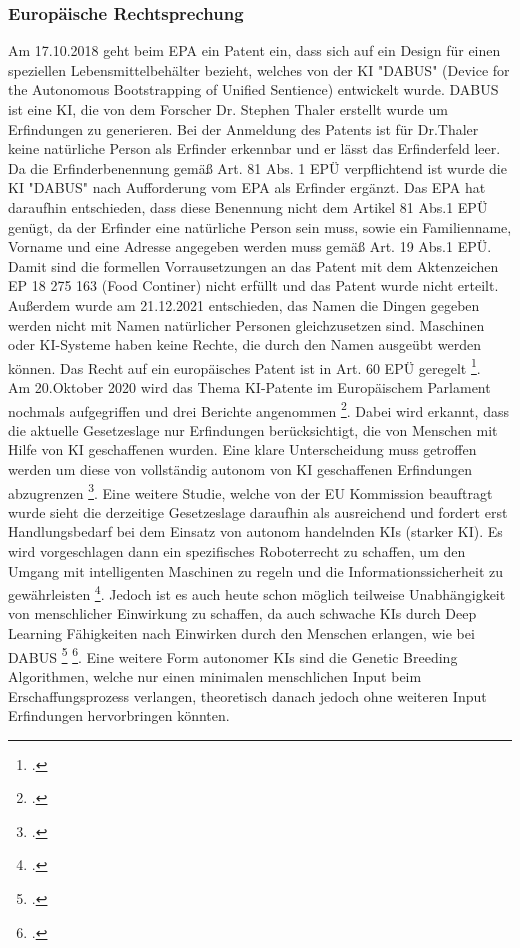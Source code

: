 \subsubsection{Europäische Rechtsprechung}
Am 17.10.2018 geht beim \gls{EPA} ein Patent ein, 
dass sich auf ein Design für einen speziellen Lebensmittelbehälter
bezieht,
welches von der KI "DABUS" (Device for the Autonomous Bootstrapping of Unified Sentience) 
entwickelt wurde. DABUS ist eine
KI, die von dem Forscher Dr. Stephen Thaler erstellt wurde
um Erfindungen zu generieren.
Bei der Anmeldung des Patents ist für Dr.Thaler 
keine natürliche Person als Erfinder
erkennbar und er lässt das Erfinderfeld
leer. Da die Erfinderbenennung gemäß Art. 81 Abs. 1 EPÜ verpflichtend
ist wurde die KI 
"DABUS"
nach Aufforderung vom EPA
als Erfinder ergänzt.
Das EPA hat daraufhin entschieden, 
dass diese Benennung nicht dem Artikel 81 Abs.1 \gls{EPÜ}  genügt,
da der Erfinder eine natürliche Person sein muss, sowie ein 
Familienname, Vorname und eine Adresse angegeben werden muss
gemäß Art. 19 Abs.1 EPÜ.
Damit sind die formellen Vorrausetzungen an das Patent mit dem Aktenzeichen
EP 18 275 163 (Food Continer) nicht erfüllt und das Patent wurde nicht erteilt. 
Außerdem wurde am 21.12.2021 entschieden, das Namen die Dingen gegeben werden nicht
mit Namen natürlicher Personen gleichzusetzen sind. Maschinen oder KI-Systeme 
haben keine Rechte, die durch den Namen ausgeübt werden können.
Das Recht auf ein europäisches Patent
ist in Art. 60 EPÜ geregelt \footcite{000820Designation}. 
\\
Am 20.Oktober 2020 wird das Thema KI-Patente im Europäischem
Parlament nochmals aufgegriffen und drei Berichte angenommen 
\footcite{KIRegelnWofuerEuropaeische2020}.
Dabei wird erkannt, 
dass die aktuelle Gesetzeslage nur Erfindungen berücksichtigt,
die von Menschen mit Hilfe von KI geschaffenen wurden. 
Eine klare Unterscheidung muss getroffen werden um diese 
von vollständig autonom von KI geschaffenen Erfindungen abzugrenzen
\footcite{TextsAdoptedIntellectual}.
Eine weitere Studie, welche von der EU Kommission beauftragt wurde 
sieht die derzeitige Gesetzeslage daraufhin als ausreichend 
und fordert erst Handlungsbedarf bei dem Einsatz 
von autonom handelnden KIs (starker KI).
Es wird vorgeschlagen dann ein spezifisches Roboterrecht zu schaffen, 
um den Umgang mit intelligenten Maschinen zu regeln 
und die Informationssicherheit zu gewährleisten
\footcite{gutaAPPLICABILITYGDPRARTIFICIAL2022}.
Jedoch ist es auch heute schon möglich teilweise 
Unabhängigkeit von menschlicher Einwirkung
zu schaffen, da auch schwache KIs durch Deep Learning 
Fähigkeiten nach Einwirken durch den Menschen erlangen, wie bei DABUS
\footcite{surdenMachineLearningLaw} \footcite{dornisDornisSchopfungOhne2021}.
Eine weitere Form autonomer KIs sind die Genetic Breeding Algorithmen,
welche
nur einen minimalen menschlichen Input beim Erschaffungsprozess 
verlangen, theoretisch danach jedoch ohne weiteren Input Erfindungen 
hervorbringen könnten.




